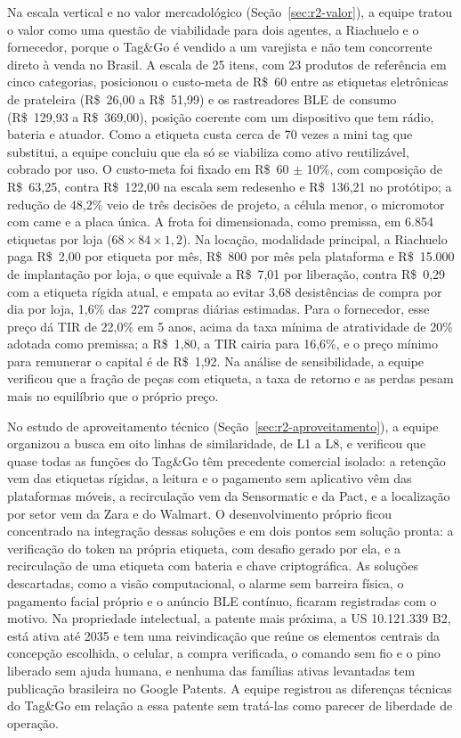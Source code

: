 Na escala vertical e no valor mercadológico (Seção~\ref{sec:r2-valor}), a equipe tratou o valor como uma questão de viabilidade para dois agentes, a Riachuelo e o fornecedor, porque o Tag\&Go é vendido a um varejista e não tem concorrente direto à venda no Brasil. A escala de 25 itens, com 23 produtos de referência em cinco categorias, posicionou o custo-meta de R\$~60 entre as etiquetas eletrônicas de prateleira (R\$~26,00 a R\$~51,99) e os rastreadores BLE de consumo (R\$~129,93 a R\$~369,00), posição coerente com um dispositivo que tem rádio, bateria e atuador. Como a etiqueta custa cerca de 70 vezes a mini tag que substitui, a equipe concluiu que ela só se viabiliza como ativo reutilizável, cobrado por uso. O custo-meta foi fixado em R\$~60 $\pm$ 10\%, com composição de R\$~63,25, contra R\$~122,00 na escala sem redesenho e R\$~136,21 no protótipo; a redução de 48,2\% veio de três decisões de projeto, a célula menor, o micromotor com came e a placa única. A frota foi dimensionada, como premissa, em 6.854 etiquetas por loja ($68 \times 84 \times 1{,}2$). Na locação, modalidade principal, a Riachuelo paga R\$~2,00 por etiqueta por mês, R\$~800 por mês pela plataforma e R\$~15.000 de implantação por loja, o que equivale a R\$~7,01 por liberação, contra R\$~0,29 com a etiqueta rígida atual, e empata ao evitar 3,68 desistências de compra por dia por loja, 1,6\% das 227 compras diárias estimadas. Para o fornecedor, esse preço dá TIR de 22,0\% em 5 anos, acima da taxa mínima de atratividade de 20\% adotada como premissa; a R\$~1,80, a TIR cairia para 16,6\%, e o preço mínimo para remunerar o capital é de R\$~1,92. Na análise de sensibilidade, a equipe verificou que a fração de peças com etiqueta, a taxa de retorno e as perdas pesam mais no equilíbrio que o próprio preço.

No estudo de aproveitamento técnico (Seção~\ref{sec:r2-aproveitamento}), a equipe organizou a busca em oito linhas de similaridade, de L1 a L8, e verificou que quase todas as funções do Tag\&Go têm precedente comercial isolado: a retenção vem das etiquetas rígidas, a leitura e o pagamento sem aplicativo vêm das plataformas móveis, a recirculação vem da Sensormatic e da Pact, e a localização por setor vem da Zara e do Walmart. O desenvolvimento próprio ficou concentrado na integração dessas soluções e em dois pontos sem solução pronta: a verificação do token na própria etiqueta, com desafio gerado por ela, e a recirculação de uma etiqueta com bateria e chave criptográfica. As soluções descartadas, como a visão computacional, o alarme sem barreira física, o pagamento facial próprio e o anúncio BLE contínuo, ficaram registradas com o motivo. Na propriedade intelectual, a patente mais próxima, a US 10.121.339 B2, está ativa até 2035 e tem uma reivindicação que reúne os elementos centrais da concepção escolhida, o celular, a compra verificada, o comando sem fio e o pino liberado sem ajuda humana, e nenhuma das famílias ativas levantadas tem publicação brasileira no Google Patents. A equipe registrou as diferenças técnicas do Tag\&Go em relação a essa patente sem tratá-las como parecer de liberdade de operação.

